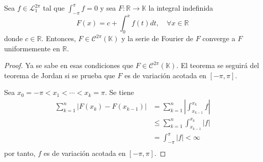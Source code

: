 \documentclass[12pt]{report}
\theoremstyle{largebreak}
\renewcommand{\leq}{\ensuremath{\leqslant}}
\newcommand\abs[1]{\ensuremath{\left|#1\right|}}
\newcommand\cf[3]{\ensuremath{#1:#2\rightarrow#3}}
\begin{document}
    \begin{cor}
        Sea $f\in\mathcal{L}_1^{2\pi}$ tal que $\int_{-\pi}^\pi f=0$ y sea $\cf{F}{\mathbb{R}}{\mathbb{K}}$ la integral indefinida
        \begin{equation*}
            F(x)=c+\int_0^x f(t)dt,\quad\forall x\in\mathbb{R}
        \end{equation*}
        donde $c\in\mathbb{R}$. Entonces, $F\in\mathcal{C}^{2\pi}(\mathbb{K})$ y la serie de Fourier de $F$ converge a $F$ uniformemente en $\mathbb{R}$. 
    \end{cor}

    \begin{proof}
        Ya se sabe en esas condiciones que $F\in\mathcal{C}^{2\pi}(\mathbb{K})$. El teorema se seguirá del teorema de Jordan si se prueba que $F$ es de variación acotada en $[-\pi,\pi]$.

        Sea $x_0=-\pi<x_1<\cdots<x_k=\pi$. Se tiene
        \begin{equation*}
            \begin{split}
                \sum_{ k=1}^n\abs{F(x_k)-F(x_{ k-1})}&=\sum_{ k=1}^n\abs{\int_{ x_{ k-1}}^{x_k}f}\\
                &\leq\sum_{ k=1}^n\int_{ x_{ k-1}}^{x_k}\abs{f}\\
                &=\int_{-\pi}^\pi\abs{f}<\infty \\
            \end{split}
        \end{equation*}
        por tanto, $f$ es de variación acotada en $[-\pi,\pi]$.
    \end{proof}
\end{document}
